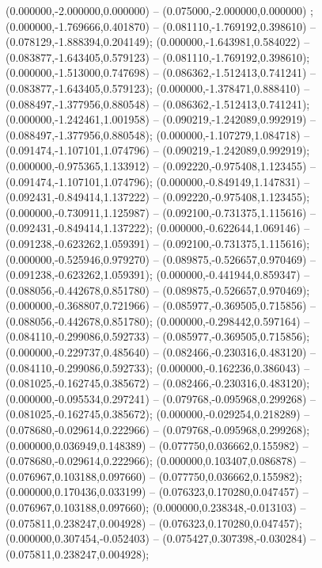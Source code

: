  (0.000000,-2.000000,0.000000) -- (0.075000,-2.000000,0.000000) ;
 (0.000000,-1.769666,0.401870) -- (0.081110,-1.769192,0.398610) -- (0.078129,-1.888394,0.204149);
 (0.000000,-1.643981,0.584022) -- (0.083877,-1.643405,0.579123) -- (0.081110,-1.769192,0.398610);
 (0.000000,-1.513000,0.747698) -- (0.086362,-1.512413,0.741241) -- (0.083877,-1.643405,0.579123);
 (0.000000,-1.378471,0.888410) -- (0.088497,-1.377956,0.880548) -- (0.086362,-1.512413,0.741241);
 (0.000000,-1.242461,1.001958) -- (0.090219,-1.242089,0.992919) -- (0.088497,-1.377956,0.880548);
 (0.000000,-1.107279,1.084718) -- (0.091474,-1.107101,1.074796) -- (0.090219,-1.242089,0.992919);
 (0.000000,-0.975365,1.133912) -- (0.092220,-0.975408,1.123455) -- (0.091474,-1.107101,1.074796);
 (0.000000,-0.849149,1.147831) -- (0.092431,-0.849414,1.137222) -- (0.092220,-0.975408,1.123455);
 (0.000000,-0.730911,1.125987) -- (0.092100,-0.731375,1.115616) -- (0.092431,-0.849414,1.137222);
 (0.000000,-0.622644,1.069146) -- (0.091238,-0.623262,1.059391) -- (0.092100,-0.731375,1.115616);
 (0.000000,-0.525946,0.979270) -- (0.089875,-0.526657,0.970469) -- (0.091238,-0.623262,1.059391);
 (0.000000,-0.441944,0.859347) -- (0.088056,-0.442678,0.851780) -- (0.089875,-0.526657,0.970469);
 (0.000000,-0.368807,0.721966) -- (0.085977,-0.369505,0.715856) -- (0.088056,-0.442678,0.851780);
 (0.000000,-0.298442,0.597164) -- (0.084110,-0.299086,0.592733) -- (0.085977,-0.369505,0.715856);
 (0.000000,-0.229737,0.485640) -- (0.082466,-0.230316,0.483120) -- (0.084110,-0.299086,0.592733);
 (0.000000,-0.162236,0.386043) -- (0.081025,-0.162745,0.385672) -- (0.082466,-0.230316,0.483120);
 (0.000000,-0.095534,0.297241) -- (0.079768,-0.095968,0.299268) -- (0.081025,-0.162745,0.385672);
 (0.000000,-0.029254,0.218289) -- (0.078680,-0.029614,0.222966) -- (0.079768,-0.095968,0.299268);
 (0.000000,0.036949,0.148389) -- (0.077750,0.036662,0.155982) -- (0.078680,-0.029614,0.222966);
 (0.000000,0.103407,0.086878) -- (0.076967,0.103188,0.097660) -- (0.077750,0.036662,0.155982);
 (0.000000,0.170436,0.033199) -- (0.076323,0.170280,0.047457) -- (0.076967,0.103188,0.097660);
 (0.000000,0.238348,-0.013103) -- (0.075811,0.238247,0.004928) -- (0.076323,0.170280,0.047457);
 (0.000000,0.307454,-0.052403) -- (0.075427,0.307398,-0.030284) -- (0.075811,0.238247,0.004928);
